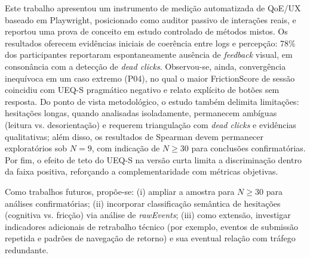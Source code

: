 \documentclass[12pt]{article}
\begin{document}
Este trabalho apresentou um instrumento de medição automatizada de QoE/UX baseado em Playwright, posicionado como auditor passivo de interações reais, e reportou uma prova de conceito em estudo controlado de métodos mistos. Os resultados oferecem evidências iniciais de coerência entre logs e percepção: 78\% dos participantes reportaram espontaneamente ausência de \textit{feedback} visual, em consonância com a detecção de \textit{dead clicks}. Observou-se, ainda, convergência inequívoca em um caso extremo (P04), no qual o maior FrictionScore de sessão coincidiu com UEQ-S pragmático negativo e relato explícito de botões sem resposta. Do ponto de vista metodológico, o estudo também delimita limitações: hesitações longas, quando analisadas isoladamente, permanecem ambíguas (leitura vs. desorientação) e requerem triangulação com \textit{dead clicks} e evidências qualitativas; além disso, os resultados de Spearman devem permanecer exploratórios sob $N = 9$, com indicação de $N \geq 30$ para conclusões confirmatórias. Por fim, o efeito de teto do UEQ-S na versão curta limita a discriminação dentro da faixa positiva, reforçando a complementaridade com métricas objetivas.

Como trabalhos futuros, propõe-se: (i) ampliar a amostra para $N \geq 30$ para análises confirmatórias; (ii) incorporar classificação semântica de hesitações (cognitiva vs. fricção) via análise de \textit{rawEvents}; (iii) como extensão, investigar indicadores adicionais de retrabalho técnico (por exemplo, eventos de submissão repetida e padrões de navegação de retorno) e sua eventual relação com tráfego redundante.





\end{document}

